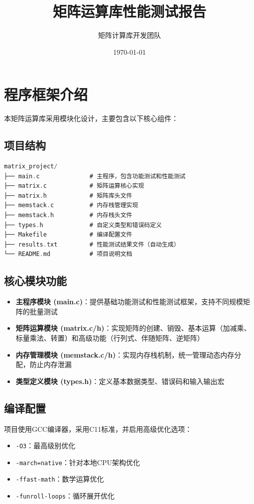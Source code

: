 \documentclass[12pt,a4paper]{article}
\title{\textbf{矩阵运算库性能测试报告}}
\author{矩阵计算库开发团队}
\date{\today}
\begin{document}
\maketitle

\section{程序框架介绍}

本矩阵运算库采用模块化设计，主要包含以下核心组件：

\subsection{项目结构}

\begin{lstlisting}[language=c]
matrix_project/
├── main.c              # 主程序，包含功能测试和性能测试
├── matrix.c            # 矩阵运算核心实现
├── matrix.h            # 矩阵库头文件
├── memstack.c          # 内存栈管理实现
├── memstack.h          # 内存栈头文件
├── types.h             # 自定义类型和错误码定义
├── Makefile            # 编译配置文件
├── results.txt         # 性能测试结果文件（自动生成）
└── README.md           # 项目说明文档
\end{lstlisting}

\subsection{核心模块功能}

\begin{itemize}
    \item \textbf{主程序模块 (main.c)}：提供基础功能测试和性能测试框架，支持不同规模矩阵的批量测试
    \item \textbf{矩阵运算模块 (matrix.c/h)}：实现矩阵的创建、销毁、基本运算（加减乘、标量乘法、转置）和高级功能（行列式、伴随矩阵、逆矩阵）
    \item \textbf{内存管理模块 (memstack.c/h)}：实现内存栈机制，统一管理动态内存分配，防止内存泄漏
    \item \textbf{类型定义模块 (types.h)}：定义基本数据类型、错误码和输入输出宏
\end{itemize}

\subsection{编译配置}

项目使用GCC编译器，采用C11标准，并启用高级优化选项：
\begin{itemize}
    \item \texttt{-O3}：最高级别优化
    \item \texttt{-march=native}：针对本地CPU架构优化
    \item \texttt{-ffast-math}：数学运算优化
    \item \texttt{-funroll-loops}：循环展开优化
\end{itemize}
\end{document}
